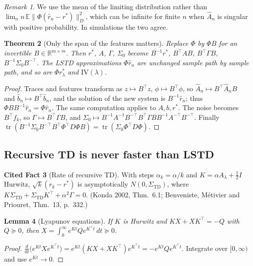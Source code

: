 \documentclass[11pt]{article}
\newtheorem{theorem}{Theorem}[section]
\newtheorem{lemma}[theorem]{Lemma}
\theoremstyle{definition}
\newtheorem{fact}[theorem]{Cited Fact}
\theoremstyle{remark}
\newtheorem{remark}[theorem]{Remark}
\newcommand{\R}{\mathbb{R}}
\newcommand{\E}{\mathbb{E}}
\newcommand{\IV}{\mathrm{IV}}
\DeclareMathOperator{\tr}{tr}
\begin{document}
\begin{remark}
We use the mean of the limiting distribution rather than
$\lim_n n\,\E\|\Phi(\hat r_n - r^*)\|_D^2$, which can be infinite for finite $n$ when
$\hat A_n$ is singular with positive probability. In simulations the two agree.
\end{remark}

\begin{theorem}[Only the span of the features matters]\label{thm:basis}
Replace $\Phi$ by $\Phi B$ for an invertible $B \in \R^{m\times m}$. Then
$r^*$, $A$, $\Gamma$, $\Sigma_0$ become $B^{-1}r^*$, $B^\top AB$, $B^\top\Gamma B$,
$B^{-1}\Sigma_0B^{-\top}$. The LSTD approximations $\Phi\hat r_n$ are unchanged
sample path by sample path, and so are $\Phi r^*_\lambda$ and $\IV(\lambda)$.
\end{theorem}
\begin{proof}
Traces and features transform as $z \mapsto B^\top z$, $\phi \mapsto B^\top\phi$, so
$\hat A_n \mapsto B^\top\hat A_n B$ and $\hat b_n \mapsto B^\top\hat b_n$, and the
solution of the new system is $B^{-1}\hat r_n$; thus $\Phi B B^{-1}\hat r_n = \Phi\hat r_n$.
The same computation applies to $A, b, r^*$. The noise becomes $B^\top f_k$, so
$\Gamma \mapsto B^\top\Gamma B$, and $\Sigma_0 \mapsto B^{-1}A^{-1}B^{-\top}B^\top\Gamma B B^{-1}A^{-\top}B^{-\top}$.
Finally $\tr(B^{-1}\Sigma_0B^{-\top}B^\top\Phi^\top D\Phi B) = \tr(\Sigma_0\Phi^\top D\Phi)$.
\end{proof}

\subsection{Recursive TD is never faster than LSTD}

\begin{fact}[Rate of recursive TD]\label{fact:td}
With steps $\alpha_k = \alpha/k$ and $K = \alpha A_\lambda + \tfrac12 I$ Hurwitz,
$\sqrt k(r_k - r^*)$ is asymptotically $N(0,\Sigma_{\mathrm{TD}})$, where
$K\Sigma_{\mathrm{TD}} + \Sigma_{\mathrm{TD}}K^\top + \alpha^2\Gamma = 0$.
(Konda 2002, Thm.~6.1; Benveniste, M\'etivier and Priouret, Thm.~13, p.~332.)
\end{fact}

\begin{lemma}[Lyapunov equations]\label{lem:lyap}
If $K$ is Hurwitz and $KX + XK^\top = -Q$ with $Q \succeq 0$, then
$X = \int_0^\infty e^{Kt}Qe^{K^\top t}\,dt \succeq 0$.
\end{lemma}
\begin{proof}
$\frac{d}{dt}\big(e^{Kt}Xe^{K^\top t}\big) = e^{Kt}(KX + XK^\top)e^{K^\top t}
= -e^{Kt}Qe^{K^\top t}$. Integrate over $[0,\infty)$ and use $e^{Kt}\to0$.
\end{proof}
\end{document}
